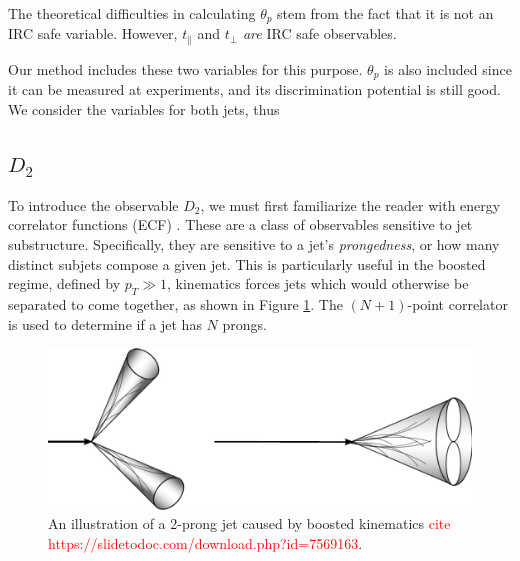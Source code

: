 \documentclass[10pt,a4paper]{book}
\newcommand\todo[1]{\textcolor{red}{#1}}
\begin{document}
The theoretical difficulties in calculating $\theta_p$ stem from the fact that it is not an IRC safe variable. However, $t_\parallel$ and $t_\perp$ \emph{are} IRC safe observables. 

Our method includes these two variables for this purpose. $\theta_p$ is also included since it can be measured at experiments, and its discrimination potential is still good. We consider the variables for both jets, thus 

\subsection{$D_2$}

To introduce the observable $D_2$, we must first familiarize the reader with energy correlator functions (ECF) \cite{Larkoski:2013eya}. These are a class of observables sensitive to jet substructure. Specifically, they are sensitive to a jet's \emph{prongedness}, or how many distinct subjets compose a given jet. This is particularly useful in the boosted regime, defined by $p_T \gg 1$, kinematics forces jets which would otherwise be separated to come together, as shown in Figure \ref{two pronged boost}. The $(N+1)$-point correlator is used to determine if a jet has $N$ prongs.

\begin{figure}
\centering
\includegraphics[scale=0.35]{ch4_images/two_prong}
\caption{An illustration of a 2-prong jet caused by boosted kinematics \todo{cite https://slidetodoc.com/download.php?id=7569163}.}
\label{two pronged boost}
\end{figure}
\end{document}
